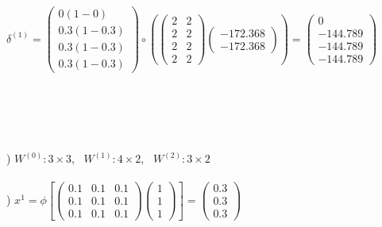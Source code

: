 \documentclass[12pt]{article}
\begin{document}
\indent $\delta^{(1)} = 
\begin{pmatrix}
0(1 - 0) \\ 0.3(1 - 0.3) \\ 0.3(1 - 0.3) \\ 0.3(1 - 0.3)
\end{pmatrix} \circ \left(
\begin{pmatrix}
2 & 2 \\
2 & 2 \\
2 & 2 \\
2 & 2 
\end{pmatrix}
\begin{pmatrix}
-172.368 \\ -172.368
\end{pmatrix}\right) = 
\begin{pmatrix}
0 \\ -144.789 \\ -144.789 \\ -144.789
\end{pmatrix}
$\\










\ \\\\\\\\\\



) $W^{(0)}: 3\times3$, \ $W^{(1)}: 4\times2$, \ $W^{(2)}: 3\times2$\\



\noindent \hrulefill \\



) $x^1 = \phi\left[
\begin{pmatrix}
0.1 & 0.1 & 0.1\\
0.1 & 0.1 & 0.1\\
0.1 & 0.1 & 0.1
\end{pmatrix}
\begin{pmatrix}
1\\ 1\\ 1
\end{pmatrix}\right]=
\begin{pmatrix}
0.3\\ 0.3\\ 0.3
\end{pmatrix}$\\\\
\end{document}
